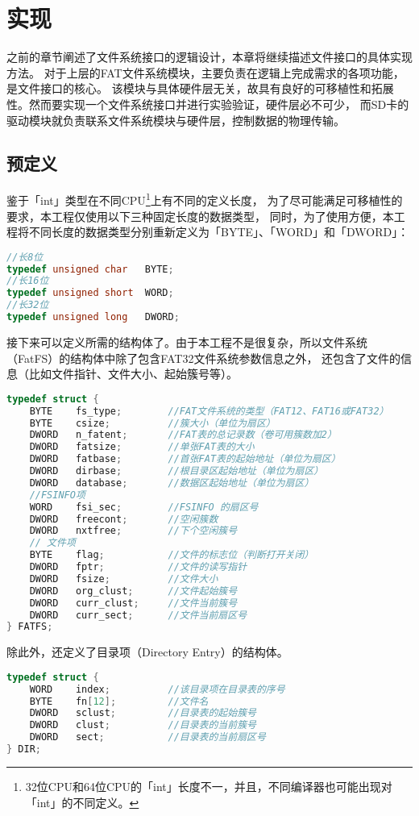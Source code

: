
\chapter{实现}
\label{chap:Implementation}
之前的章节阐述了文件系统接口的逻辑设计，本章将继续描述文件接口的具体实现方法。
对于上层的FAT文件系统模块，主要负责在逻辑上完成需求的各项功能，是文件接口的核心。
该模块与具体硬件层无关，故具有良好的可移植性和拓展性。然而要实现一个文件系统接口并进行实验验证，硬件层必不可少，
而SD卡的驱动模块就负责联系文件系统模块与硬件层，控制数据的物理传输。

\section{预定义}
\label{sec:Defination}
鉴于「int」类型在不同CPU\footnote{32位CPU和64位CPU的「int」长度不一，并且，不同编译器也可能出现对「int」的不同定义。}上有不同的定义长度，
为了尽可能满足可移植性的要求，本工程仅使用以下三种固定长度的数据类型，
同时，为了使用方便，本工程将不同长度的数据类型分别重新定义为「BYTE」、「WORD」和「DWORD」：
\begin{lstlisting}[language={C}, caption={数据类型重定义}]
//长8位
typedef unsigned char	BYTE;
//长16位
typedef unsigned short	WORD;
//长32位
typedef unsigned long	DWORD;
\end{lstlisting}

接下来可以定义所需的结构体了。由于本工程不是很复杂，所以文件系统（FatFS）的结构体中除了包含FAT32文件系统参数信息之外，
还包含了文件的信息（比如文件指针、文件大小、起始簇号等）。
\begin{lstlisting}[language={C}, caption={文件系统数据类型}]
typedef struct {
	BYTE	fs_type;        //FAT文件系统的类型（FAT12、FAT16或FAT32）
	BYTE	csize;          //簇大小（单位为扇区）
	DWORD	n_fatent;       //FAT表的总记录数（卷可用簇数加2）
    DWORD   fatsize;        //单张FAT表的大小
	DWORD	fatbase;        //首张FAT表的起始地址（单位为扇区）
	DWORD	dirbase;        //根目录区起始地址（单位为扇区）
	DWORD	database;       //数据区起始地址（单位为扇区）
    //FSINFO项
    WORD    fsi_sec;        //FSINFO 的扇区号
    DWORD   freecont;       //空闲簇数
    DWORD   nxtfree;        //下个空闲簇号
    // 文件项
    BYTE    flag;           //文件的标志位（判断打开关闭）
    DWORD	fptr;           //文件的读写指针
	DWORD	fsize;          //文件大小
	DWORD	org_clust;      //文件起始簇号
	DWORD	curr_clust;     //文件当前簇号
	DWORD	curr_sect;		//文件当前扇区号
} FATFS;
\end{lstlisting}
除此外，还定义了目录项（Directory Entry）的结构体。
\begin{lstlisting}[language={C}, caption={目录项数据类型}]
typedef struct {
	WORD	index;          //该目录项在目录表的序号
	BYTE	fn[12];         //文件名
	DWORD	sclust;         //目录表的起始簇号
	DWORD	clust;          //目录表的当前簇号
	DWORD	sect;           //目录表的当前扇区号
} DIR;
\end{lstlisting}

